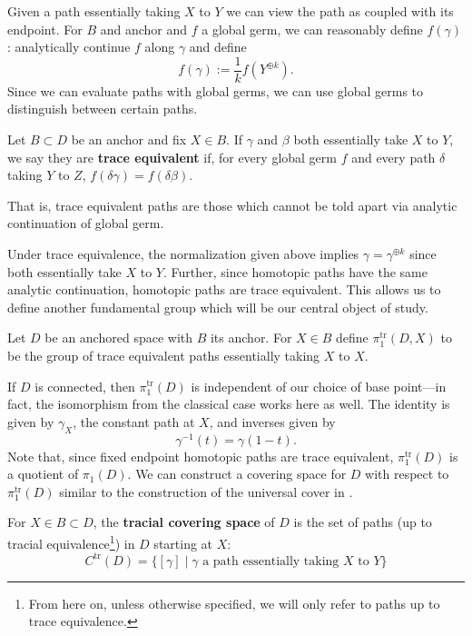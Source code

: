 Given a path essentially taking \(X\) to \(Y\) we can view the path as coupled
with its endpoint. For \(B\) and anchor and \(f\) a global germ, we can
reasonably define \(f(\gamma)\): analytically continue \(f\) along \(\gamma\) and define
\[
  f(\gamma) := \frac{1}{k} f(Y^{\oplus k}).
\]
Since we can evaluate paths with global germs, we can use global germs to
distinguish between certain paths.

\begin{definition}
\label{def:label}
  Let \(B \subset D\) be an anchor and fix \(X \in B\). If \(\gamma\) and
  \(\beta\) both essentially take \(X\) to \(Y\), we say they are
  \textbf{trace equivalent} if, for every global germ \(f\) and every path
  \(\delta\) taking \(Y\) to \(Z\), \(f(\delta\gamma)=f(\delta\beta)\).

  That is, trace equivalent paths are those which cannot be told apart via
  analytic continuation of global germ.
\end{definition}

Under trace equivalence, the normalization given above implies
\(\gamma = \gamma^{\oplus k}\) since both essentially take \(X\) to \(Y\).
Further, since homotopic paths have the same analytic continuation, homotopic
paths are trace equivalent. This allows us to define another fundamental group
which will be our central object of study.
\begin{definition}%
\label{def:trpi1}
 Let \(D\) be an anchored space with \(B\) its anchor. For \(X \in B\) define
 \(\pi_1^{\textrm{tr}}(D,X)\) to be the group of trace equivalent paths
 essentially taking \(X\) to \(X\).
\end{definition}
If \(D\) is connected, then \(\pi_1^{\textrm{tr}}(D)\) is independent of our
choice of base point---in fact, the isomorphism from the classical case
works here as well. The identity is given by \(\gamma_X\), the
constant path at \(X\), and inverses given by
\[
  \gamma ^{-1}(t) = \gamma (1-t).
\]
Note that, since fixed endpoint homotopic paths are trace equivalent,
\(\pi_1^{\textrm{tr}}(D)\) is a quotient of \(\pi_1(D)\). We can construct a covering
space for \(D\) with respect to \(\pi_1^{\textrm{tr}}(D)\) similar to the
construction of the universal cover in \cite{hatcherAlgebraic2002}.

\begin{definition}%
\label{def:trcover}
  For \(X \in B \subset D\), the \textbf{tracial covering space} of \(D\) is the
  set of paths {(up to tracial equivalence\footnote{From here on, unless otherwise specified, we will only refer to
    paths up to trace equivalence.})}
  in \(D\) starting at \(X\):
  \[
    C^{\textrm{tr}}(D) = \{[\gamma] \mid \gamma \text{ a path essentially taking
    \(X\) to \(Y\)}\}
  \]
\end{definition}

